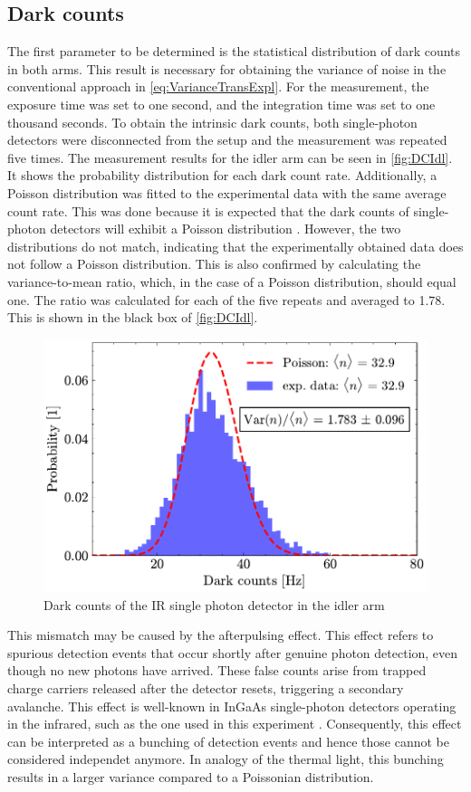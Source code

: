 \subsection{Dark counts}
The first parameter to be determined is the statistical distribution of dark counts in both arms. This result is necessary for obtaining the variance of noise in the conventional approach in \autoref{eq:VarianceTransExpl}. For the measurement, the exposure time was set to one second, and the integration time was set to one thousand seconds. To obtain the intrinsic dark counts, both single-photon detectors were disconnected from the setup and the measurement was repeated five times. \newline
The measurement results for the idler arm can be seen in \autoref{fig:DCIdl}. It shows the probability distribution for each dark count rate. Additionally, a Poisson distribution was fitted to the experimental data with the same average count rate. This was done because it is expected that the dark counts of single-photon detectors will exhibit a Poisson distribution \cite{foucheDetectionFalsealarmProbabilities2003}. However, the two distributions do not match, indicating that the experimentally obtained data does not follow a Poisson distribution. This is also confirmed by calculating the variance-to-mean ratio, which, in the case of a Poisson distribution, should equal one. The ratio was calculated for each of the five repeats and averaged to 1.78. This is shown in the black box of \autoref{fig:DCIdl}. 
\begin{figure}[tb!]
	\centering
	\includegraphics[width=.7\textwidth]{Images/DC_Idl_2.pdf}
	\caption{Dark counts of the IR single photon detector in the idler arm}
	\label{fig:DCIdl}
\end{figure}\newline
This mismatch may be caused by the afterpulsing effect. This effect refers to spurious detection events that occur shortly after genuine photon detection, even though no new photons have arrived. These false counts arise from trapped charge carriers released after the detector resets, triggering a secondary avalanche. This effect is well-known in InGaAs single-photon detectors operating in the infrared, such as the one used in this experiment \cite{laiImpactAfterpulsingEffects2024}. Consequently, this effect can be interpreted as a bunching of detection events and hence those cannot be considered independet anymore. In analogy of the thermal light, this bunching results in a larger variance compared to a Poissonian distribution. \newline

